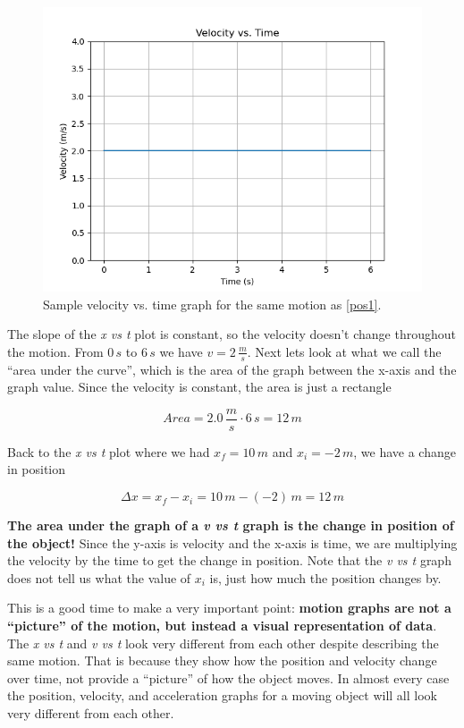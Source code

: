 \documentclass[12pt]{book}
\begin{document}
\begin{figure}[H]
\centering
\includegraphics[scale=0.6]{velocity1.png}
\caption{Sample velocity vs. time graph for the same motion as \ref{pos1}.}
\end{figure}

The slope of the \textit{x vs t} plot is constant, so the velocity doesn't change throughout the motion. From $0 \, s$ to $6 \, s$ we have $v = 2 \, \frac{m}{s}$. Next lets look at what we call the ``area under the curve'', which is the area of the graph between the x-axis and the graph value. Since the velocity is constant, the area is just a rectangle

\begin{equation}
Area = 2.0 \, \frac{m}{s} \cdot 6 \, s = 12 \, m
\end{equation}

Back to the \textit{x vs t} plot where we had $x_f = 10 \, m$ and $x_i = -2 \, m$, we have a change in position

\begin{equation}
\Delta x = x_f - x_i = 10 \, m - (-2) \, m = 12 \, m
\end{equation}

\textbf{The area under the graph of a \textit{v vs t} graph is the change in position of the object!} Since the y-axis is velocity and the x-axis is time, we are multiplying the velocity by the time to get the change in position. Note that the \textit{v vs t} graph does not tell us what the value of $x_i$ is, just how much the position changes by.


This is a good time to make a very important point: \textbf{motion graphs are not a ``picture'' of the motion, but instead a visual representation of data}. The \textit{x vs t} and \textit{v vs t} look very different from each other despite describing the same motion. That is because they show how the position and velocity change over time, not provide a ``picture'' of how the object moves. In almost every case the position, velocity, and acceleration graphs for a moving object will all look very different from each other.
\end{document}
